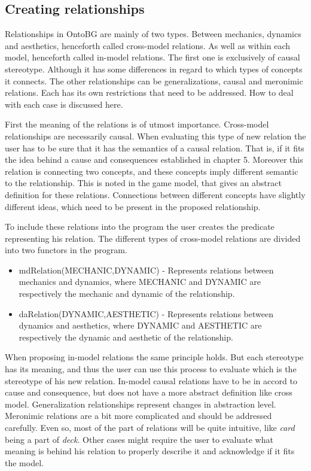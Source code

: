 \subsection{Creating relationships}

Relationships in OntoBG are mainly of two types. Between mechanics, dynamics and aesthetics, henceforth called cross-model relations. As well as within each model, henceforth called in-model relations. The first one is exclusively of causal stereotype. Although it has some differences in regard to which types of concepts it connects. The other relationships can be generalizations, causal and meronimic relations. Each has its own restrictions that need to be addressed. How to deal with each case is discussed here.

First the meaning of the relations is of utmost importance. Cross-model relationships are necessarily causal. When evaluating this type of new relation the user has to be sure that it has the semantics of a causal relation. That is, if it fits the idea behind a cause and consequences established in chapter 5. Moreover this relation is connecting two concepts, and these concepts imply different semantic to the relationship. This is noted in the game model, that gives an abstract definition for these relations. Connections between different concepts have slightly different ideas, which need to be present in the proposed relationship.

To include these relations into the program the user creates the predicate representing his relation. The different types of cross-model relations are divided into two functors in the program.
\begin{itemize}
    \item mdRelation(MECHANIC,DYNAMIC) - Represents relations between mechanics and dynamics, where MECHANIC and DYNAMIC are respectively the mechanic and dynamic of the relationship.
    \item daRelation(DYNAMIC,AESTHETIC) - Represents relations between dynamics and aesthetics, where DYNAMIC and AESTHETIC are respectively the dynamic and aesthetic of the relationship.
\end{itemize}

When proposing in-model relations the same principle holds. But each stereotype has its meaning, and thus the user can use this process to evaluate which is the stereotype of his new relation. In-model causal relations have to be in accord to cause and consequence, but does not have a more abstract definition like cross model. Generalization relationships represent changes in abstraction level. Meronimic relations are a bit more complicated and should be addressed carefully. Even so, most of the part of relations will be quite intuitive, like \textit{card} being a part of \textit{deck}. Other cases might require the user to evaluate what meaning is behind his relation to properly describe it and acknowledge if it fits the model.


